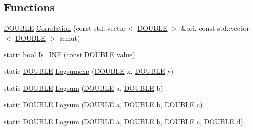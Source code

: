 \subsection*{Functions}
\begin{DoxyCompactItemize}
\item 
\hyperlink{energy__const_8hh_a8747af38b86aa2bbcda2f1b1aa0888c2}{D\+O\+U\+B\+L\+E} \hyperlink{num__operator_8hh_a439440b295c871dac913f8ac820c6437}{Correlation} (const std\+::vector$<$ \hyperlink{energy__const_8hh_a8747af38b86aa2bbcda2f1b1aa0888c2}{D\+O\+U\+B\+L\+E} $>$ \&ori, const std\+::vector$<$ \hyperlink{energy__const_8hh_a8747af38b86aa2bbcda2f1b1aa0888c2}{D\+O\+U\+B\+L\+E} $>$ \&mut)
\item 
static bool \hyperlink{num__operator_8hh_a7faa9ddfccb9193995232f218f89ea11}{Is\+\_\+\+I\+N\+F} (const \hyperlink{energy__const_8hh_a8747af38b86aa2bbcda2f1b1aa0888c2}{D\+O\+U\+B\+L\+E} value)
\item 
static \hyperlink{energy__const_8hh_a8747af38b86aa2bbcda2f1b1aa0888c2}{D\+O\+U\+B\+L\+E} \hyperlink{num__operator_8hh_a5be5e650134b0579fc1dbadd92e5f5ce}{Logsumexp} (\hyperlink{energy__const_8hh_a8747af38b86aa2bbcda2f1b1aa0888c2}{D\+O\+U\+B\+L\+E} x, \hyperlink{energy__const_8hh_a8747af38b86aa2bbcda2f1b1aa0888c2}{D\+O\+U\+B\+L\+E} y)
\item 
static \hyperlink{energy__const_8hh_a8747af38b86aa2bbcda2f1b1aa0888c2}{D\+O\+U\+B\+L\+E} \hyperlink{num__operator_8hh_ad1af57446b0c2dca5c1ac288055a4dc2}{Logsum} (\hyperlink{energy__const_8hh_a8747af38b86aa2bbcda2f1b1aa0888c2}{D\+O\+U\+B\+L\+E} a, \hyperlink{energy__const_8hh_a8747af38b86aa2bbcda2f1b1aa0888c2}{D\+O\+U\+B\+L\+E} b)
\item 
static \hyperlink{energy__const_8hh_a8747af38b86aa2bbcda2f1b1aa0888c2}{D\+O\+U\+B\+L\+E} \hyperlink{num__operator_8hh_a11f35c52d29c7099bc6964b43b17b281}{Logsum} (\hyperlink{energy__const_8hh_a8747af38b86aa2bbcda2f1b1aa0888c2}{D\+O\+U\+B\+L\+E} a, \hyperlink{energy__const_8hh_a8747af38b86aa2bbcda2f1b1aa0888c2}{D\+O\+U\+B\+L\+E} b, \hyperlink{energy__const_8hh_a8747af38b86aa2bbcda2f1b1aa0888c2}{D\+O\+U\+B\+L\+E} c)
\item 
static \hyperlink{energy__const_8hh_a8747af38b86aa2bbcda2f1b1aa0888c2}{D\+O\+U\+B\+L\+E} \hyperlink{num__operator_8hh_ab6915c34e4363a0bf706745e1d6c5acd}{Logsum} (\hyperlink{energy__const_8hh_a8747af38b86aa2bbcda2f1b1aa0888c2}{D\+O\+U\+B\+L\+E} a, \hyperlink{energy__const_8hh_a8747af38b86aa2bbcda2f1b1aa0888c2}{D\+O\+U\+B\+L\+E} b, \hyperlink{energy__const_8hh_a8747af38b86aa2bbcda2f1b1aa0888c2}{D\+O\+U\+B\+L\+E} c, \hyperlink{energy__const_8hh_a8747af38b86aa2bbcda2f1b1aa0888c2}{D\+O\+U\+B\+L\+E} d)

\end{DoxyCompactItemize}
